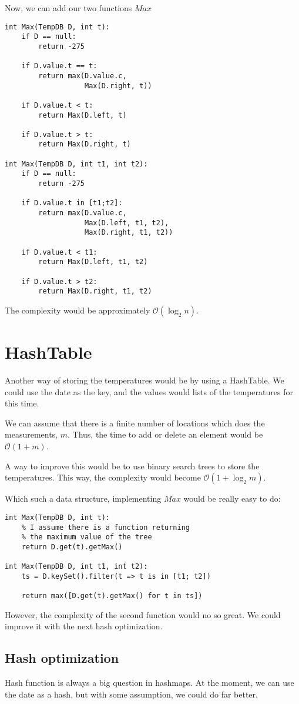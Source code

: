 	Now, we can add our two functions $Max$

\begin{lstlisting}
int Max(TempDB D, int t):
	if D == null:
		return -275

	if D.value.t == t:
		return max(D.value.c, 
				   Max(D.right, t))

	if D.value.t < t:
		return Max(D.left, t)

	if D.value.t > t:
		return Max(D.right, t)	

int Max(TempDB D, int t1, int t2):
	if D == null:
		return -275

	if D.value.t in [t1;t2]:
		return max(D.value.c, 
				   Max(D.left, t1, t2), 
				   Max(D.right, t1, t2))

	if D.value.t < t1:
		return Max(D.left, t1, t2)

	if D.value.t > t2:
		return Max(D.right, t1, t2)
\end{lstlisting}
The complexity would be approximately $\mathcal{O}(\log_2n)$.

\section{HashTable}
	Another way of storing the temperatures would be by using a HashTable.
	We could use the date as the key, and the values would lists of the temperatures for this time.

	We can assume that there is a finite number of locations which does the measurements, $m$.
	Thus, the time to add or delete an element would be $\mathcal{O}(1+m)$.

	A way to improve this would be to use binary search trees to store the temperatures. This way, the complexity would become  $\mathcal{O}(1+\log_2m)$.

	Which such a data structure, implementing $Max$ would be really easy to do:
\begin{lstlisting}
int Max(TempDB D, int t):
	% I assume there is a function returning 
	% the maximum value of the tree
	return D.get(t).getMax() 

int Max(TempDB D, int t1, int t2):
	ts = D.keySet().filter(t => t is in [t1; t2])

	return max([D.get(t).getMax() for t in ts])
\end{lstlisting}

	However, the complexity of the second function would no so great. We could improve it with the next hash optimization.

	\subsection{Hash optimization}
		Hash function is always a big question in hashmaps. At the moment, we can use the date as a hash, but with some assumption, we could do far better.

